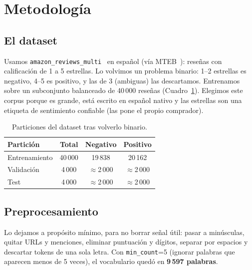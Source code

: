 \documentclass[11pt]{article}
\begin{document}
\section{Metodología}\label{sec:metodo}

\subsection{El dataset}
Usamos \texttt{amazon\_reviews\_multi}~\cite{keung2020} en español (vía MTEB~\cite{muennighoff2023}):
reseñas con calificación de 1 a 5 estrellas. Lo volvimos un problema binario: 1--2 estrellas
es negativo, 4--5 es positivo, y las de 3 (ambiguas) las descartamos. Entrenamos sobre un
subconjunto balanceado de 40\,000 reseñas (Cuadro~\ref{tab:dataset}). Elegimos este corpus
porque es grande, está escrito en español nativo y las estrellas son una etiqueta de
sentimiento confiable (las pone el propio comprador).
\begin{table}[H]
\centering
\caption{Particiones del dataset tras volverlo binario.}\label{tab:dataset}
\begin{tabular}{lccc}
\toprule
Partición & Total & Negativo & Positivo \\
\midrule
Entrenamiento & 40\,000 & 19\,838 & 20\,162 \\
Validación & 4\,000 & $\approx$2\,000 & $\approx$2\,000 \\
Test & 4\,000 & $\approx$2\,000 & $\approx$2\,000 \\
\bottomrule
\end{tabular}
\end{table}

\subsection{Preprocesamiento}
Lo dejamos a propósito mínimo, para no borrar señal útil: pasar a minúsculas, quitar URLs y
menciones, eliminar puntuación y dígitos, separar por espacios y descartar tokens de una sola
letra. Con \texttt{min\_count}=5 (ignorar palabras que aparecen menos de 5 veces), el
vocabulario quedó en \textbf{9\,597 palabras}.
\end{document}
